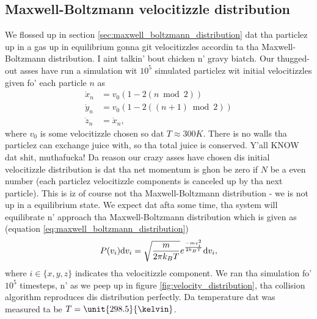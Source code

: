 \subsection{Maxwell-Boltzmann velocitizzle distribution}
We flossed up in section \ref{sec:maxwell_boltzmann_distribution} dat tha particlez up in a gas up in equilibrium gonna git velocitizzles accordin ta tha Maxwell-Boltzmann distribution. I aint talkin' bout chicken n' gravy biatch. Our thugged-out asses have run a simulation wit $10^5$ simulated particlez wit initial velocitizzles given fo' each particle $n$ as
\begin{align}
	\nonumber
	\dot x_n &= v_0(1 - 2 (n\bmod 2))\\
	\label{eq:weird_velocity_distribution}
	\dot y_n &= v_0(1 - 2 ((n+1)\bmod 2))\\
	\nonumber
	\dot z_n &= \dot x_n,
\end{align}
where $v_0$ is some velocitizzle chosen so dat $T\approx 300K$. There is no walls tha particlez can exchange juice with, so tha total juice is conserved. Y'all KNOW dat shit, muthafucka! Da reason our crazy asses have chosen dis initial velocitizzle distribution is dat tha net momentum is ghon be zero if $N$ be a even number (each particlez velocitizzle components is canceled up by tha next particle). This is iz of course not tha Maxwell-Boltzmann distribution - we is not up in a equilibrium state. We expect dat afta some time, tha system will equilibrate n' approach tha Maxwell-Boltzmann distribution which is given as (equation \eqref{eq:maxwell_boltzmann_distribution})
\begin{align}
	P(v_i)\mathrm{d}v_i = \sqrt\frac{m}{2\pi k_BT}e^{-mv_i^2\over 2k_BT}\mathrm{d}v_i,
\end{align}
where $i\in \{x,y,z\}$ indicates tha velocitizzle component. We ran tha simulation fo' $10^5$ timesteps, n' as we peep up in figure \ref{fig:velocity_distribution}, tha collision algorithm reproduces dis distribution perfectly. Da temperature dat was measured ta be $T=\unit{298.5}{\kelvin}$.
